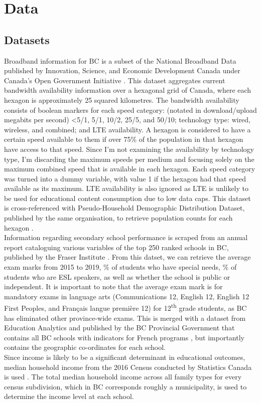 \documentclass[stu, floatsintext]{apa7}
\begin{document}
    \section{Data}
    \subsection{Datasets}
    Broadband information for BC is a subset of the National Broadband Data published by Innovation, Science, and Economic Development Canada under Canada's Open Government Initiative \autocite{nbd2021}. This dataset aggregates current bandwidth availability information over a hexagonal grid of Canada, where each hexagon is approximately 25 squared kilometres. The bandwidth availability consists of boolean markers for each speed category: (notated in download/upload megabits per second) <5/1, 5/1, 10/2, 25/5, and 50/10; technology type: wired, wireless, and combined; and LTE availability. A hexagon is considered to have a certain speed available to them if over 75\% of the population in that hexagon have access to that speed. Since I'm not examining the availability by technology type, I'm discarding the maximum speeds per medium and focusing solely on the maximum combined speed that is available in each hexagon. Each speed category was turned into a dummy variable, with value 1 if the hexagon had that speed available as its maximum. LTE availability is also ignored as LTE is unlikely to be used for educational content consumption due to low data caps. This dataset is cross-referenced with Pseudo-Household Demographic Distribution Dataset, published by the same organisation, to retrieve population counts for each hexagon \autocite{phh2020}. \\
    Information regarding secondary school performance is scraped from an annual report cataloguing various variables of the top 250 ranked schools in BC, published by the Fraser Institute \autocite{fraser}. From this datset, we can retrieve the average exam marks from 2015 to 2019, \% of students who have special needs, \% of students who are ESL speakers, as well as whether the school is public or independent. It is important to note that the average exam mark is for mandatory exams in language arts (Communications 12, English 12, English 12 First Peoples, and Français langue première 12) for 12\textsuperscript{th} grade students, as BC has eliminated other province-wide exams. This is merged with a dataset from Education Analytics and published by the BC Provincial Government that contains all BC schools with indicators for French programs \autocite{francophone2020}, but importantly contains the geographic co-ordinates for each school. \\
    Since income is likely to be a significant determinant in educational outcomes, median household income from the 2016 Census conducted by Statistics Canada is used \autocite{census2016}. The total median household income across all family types for every census subdivision, which in BC corresponds roughly a municipality, is used to determine the income level at each school. \\
\end{document}
